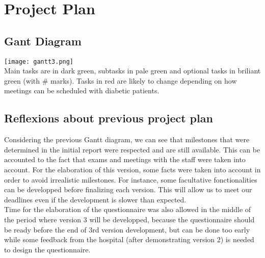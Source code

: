 \chapter{Project Plan}

\section{Gant Diagram}
\texttt{[image: gantt3.png]}\\
Main tasks are in dark green, subtasks in pale green and optional tasks in briliant green (with \# marks).
Tasks in red are likely to change depending on how meetings can be scheduled with diabetic patients.
\section{Reflexions about previous project plan}
Considering the previous Gantt diagram, we can see that milestones that were determined in the initial report were respected and are still available. This can be accounted to the fact that exams and meetings with the staff were taken into account. For the elaboration of this version, some facts were taken into account in order to avoid irrealistic milestones. For instance, some facultative fonctionalities can be developped before finalizing each version. This will allow us to meet our deadlines even if the development is slower than expected.
\\Time for the elaboration of the questionnaire was also allowed in the middle of the period where version 3 will be developped, because the questionnaire should be ready before the end of 3rd version development, but can be done too early while some feedback from the hospital (after demonstrating version 2) is needed to design the questionnaire.